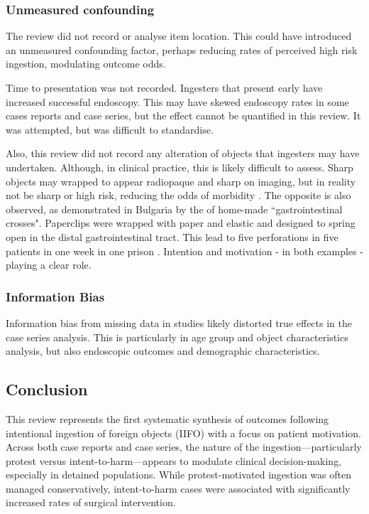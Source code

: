 \documentclass[pdflatex,sn-basic,Numbered]{sn-jnl}
\begin{document}
\subsubsection{Unmeasured confounding}
The review did not record or analyse item location. This could have introduced an unmeasured confounding factor, perhaps reducing rates of perceived high risk ingestion, modulating outcome odds. 

Time to presentation was not recorded. Ingesters that present early have increased successful endoscopy. This may have skewed endoscopy rates in some cases reports and case series, but the effect cannot be quantified in this review. It was attempted, but was difficult to standardise.

Also, this review did not record any alteration of objects that ingesters may have undertaken. Although, in clinical practice, this is likely difficult to assess. Sharp objects may wrapped to appear radiopaque and sharp on imaging, but in reality not be sharp or high risk, reducing the odds of morbidity \cite{Ataya_2013,Albeldawi_2014}. The opposite is also observed, as demonstrated in Bulgaria by the of home-made ``gastrointestinal crosses". Paperclips were wrapped with paper and elastic and designed to spring open in the distal gastrointestinal tract. This lead to five perforations in five patients in one week in one prison \cite{Losanoff_1996}. Intention and motivation - in both examples - playing a clear role.

\subsubsection{Information Bias}
Information bias from missing data in studies likely distorted true effects in the case series analysis. This is particularly in age group and object characteristics analysis, but also endoscopic outcomes and demographic characteristics.  


\subsection{Conclusion}

\noindent This review represents the first systematic synthesis of outcomes following intentional ingestion of foreign objects (IIFO) with a focus on patient motivation. Across both case reports and case series, the nature of the ingestion—particularly protest versus intent-to-harm—appears to modulate clinical decision-making, especially in detained populations. While protest-motivated ingestion was often managed conservatively, intent-to-harm cases were associated with significantly increased rates of surgical intervention. 
\end{document}
